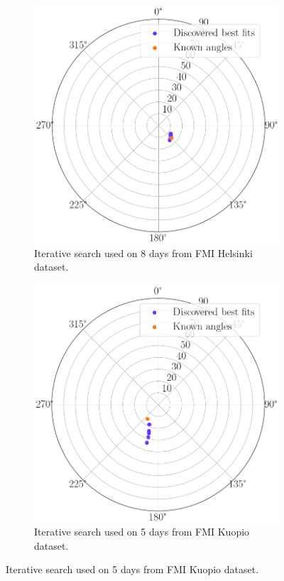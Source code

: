 
\begin{figure}[H]
     \centering
     \begin{subfigure}[b]{0.45\textwidth}
         \centering
         \includegraphics[width=\textwidth]{pics/iterative_multiday_helsinki}
         \caption{Iterative search used on 8 days from FMI Helsinki dataset.}
         \label{iterative_multiday_helsinki2019}
     \end{subfigure}
     \hfill
     \begin{subfigure}[b]{0.45\textwidth}
         \centering
         \includegraphics[width=\textwidth]{pics/iterative_multiday_kuopio}
         \caption{Iterative search used on 5 days from FMI Kuopio dataset.}
         \label{iterative_multiday_kuopio2019}
     \end{subfigure}
     \hfill
     

\end{figure}
